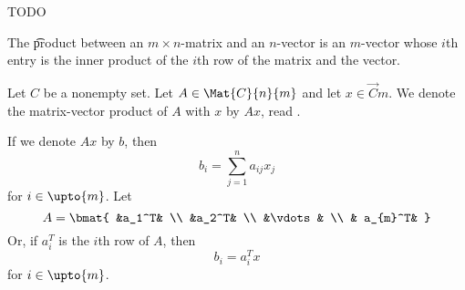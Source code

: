 

TODO


The \t{product} between an $m \times n$-matrix and an $n$-vector is an $m$-vector whose $i$th entry is the inner product of the $i$th row of the matrix and the vector.


Let $C$ be a nonempty set.
Let $A \in \Mat{C}{n}{m}$ and let $x \in \Vec{C}{m}$. We denote the matrix-vector product of $A$ with $x$ by $Ax$, read .

If we denote $Ax$ by $b$, then
$$
  b_i = \sum_{j = 1}^{n} a_{ij}x_j
$$
for $i \in \upto{m}$.
Let
$$
  A = \bmat{
    &a_1^T& \\
    &a_2^T& \\
    &\vdots & \\
    & a_{m}^T&
  }
$$
Or, if $a_i^T$ is the $i$th row of $A$, then
$$
  b_i = a_i^T x
$$
for $i \in \upto{m}$.
